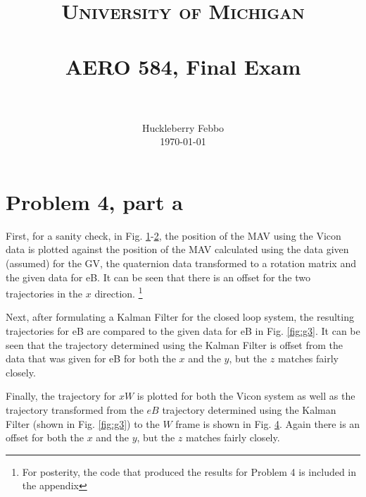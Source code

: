 \documentclass[paper=a4, fontsize=11pt]{scrartcl}
\title{
		\usefont{OT1}{bch}{b}{n}
		\normalfont \normalsize \textsc{University of Michigan} \\ [25pt]
		\horrule{0.5pt} \\[0.4cm]
		\huge AERO 584, Final Exam \\
		\horrule{2pt} \\[0.5cm]
}
\author{
		\normalfont 								\normalsize
         Huckleberry Febbo\\[-3pt]		\normalsize
        \today
}
\date{}
\numberwithin{equation}{section}		%
\numberwithin{figure}{section}			%
\numberwithin{table}{section}				%
\begin{document}
\maketitle




\section*{Problem 4, part a}
First, for a sanity check, in Fig. \ref{fig:q1}-\ref{fig:q2}, the position of the MAV using the Vicon data is plotted against the position of the MAV calculated using the data given (assumed) for the GV, the quaternion data transformed to a rotation matrix and the given data for eB. It can be seen that there is an offset for the two trajectories in the $x$ direction.
\footnote{For posterity, the code that produced the results for Problem 4 is included in the appendix}
\begin{figure}[!htb]
	\centering
    
	\caption{  \label{fig:q1}}
\end{figure}

\begin{figure}[!htb]
	\centering
    
	\caption{  \label{fig:q2}}
\end{figure}

Next, after formulating a Kalman Filter for the closed loop system, the resulting trajectories for eB are compared to the given data for eB in Fig. \ref{fig:g3}. It can be seen that the trajectory determined using the Kalman Filter is offset from the data that was given for eB for both the $x$ and the $y$, but the $z$ matches fairly closely. 

\begin{figure}[!htb]
	\centering
    
	\caption{  \label{fig:q3}}
\end{figure}

Finally, the trajectory for $xW$ is plotted for both the Vicon system as well as the trajectory transformed from the $eB$ trajectory determined using the Kalman Filter (shown in Fig. \ref{fig:g3}) to the $W$ frame is shown in Fig. \ref{fig:q4}. Again there is an offset for both the $x$ and the $y$, but the $z$ matches fairly closely.

\begin{figure}[!htb]
	\centering
    
	\caption{  \label{fig:q4}}
\end{figure}
\end{document}
